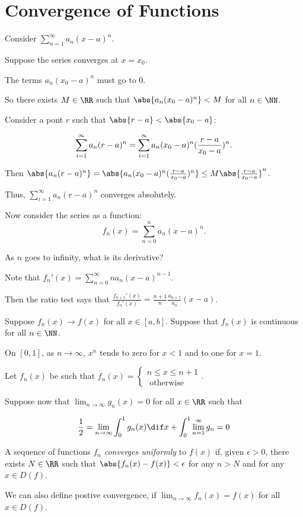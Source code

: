 \documentclass[11pt]{scrartcl}
\begin{document}
\section{Convergence of Functions}


Consider $\sum_{n=1}^{\infty}a_n(x-a)^n$.

Suppose the series converges at $x=x_0$.

The terms $a_n(x_0-a)^n$ must go to 0.

So there exists $M\in\RR$ such that $\abs{a_n(x_0-a)^n}< M$ for all $n\in\NN$.

Consider a pont $r$ such that $\abs{r-a}< \abs{x_0-a}$:

\begin{align}
\sum_{i=1}^{\infty}a_n(r-a)^n = \sum_{i=1}^{\infty}a_n(x_0-a)^n\* (\frac{r-a}{x_0-a})^n.
\end{align}

Then $\abs{a_n(r-a)^n} = \abs{a_n(x_0-a)^n(\frac{r-a}{x_0-a})^n} \leq M \abs{\frac{r-a}{x_0-a}}^n$.

Thus, $\sum_{i=1}^{\infty}a_n(r-a)^n$ converges absolutely.

Now consider the series as a function:
\begin{equation*}
f_{n}(x) = \sum_{n=0}^na_n(x-a)^n.
\end{equation*}

As $n$ goes to infinity, what is its derivative?

Note that $f_n'(x) = \sum_{n=0}^{\infty}na_n(x-a)^{n-1}$.

Then the ratio test says that $\frac{f_{n+1}'(x)}{f_n'(x)} = \frac{n+1}{n}\frac{a_{n+1}}{a_n}(x-a)$.

Suppose $f_n(x) \to f(x)$ for all $x\in [a, b]$. Suppose that $f_n(x)$
is continuous for all $n\in\NN$. 

On $[0, 1]$, as $n\to \infty$, $x^n$ tends to zero for $x<1$ and to one for $x=1$.

\begin{example}

  Let $f_n(x) $ be such that $f_n(x) = \begin{cases}
    n\leq x\leq n+1\\
    \text{ otherwise}
  \end{cases}$.

Suppose now that $\lim_{n\to\infty}g_n(x) = 0$ for all $x\in\RR$ such that

\begin{equation*}
  \frac{1}{2}=\lim_{n\to\infty}\int_0^1 g_n(x) \dif x +\int_{0}^1\lim_{n=1}^{\infty}g_{n} = 0
\end{equation*}
\end{example}
\begin{definition}
  A sequence of functions $f_n$ \textit{converges uniformly} to $f(x)$ if, given $\epsilon > 0$, there exists $N\in\RR$ such that $\abs{f_n(x) - f(x)} < \epsilon$ for any $n > N$ and for any $x\in D(f)$.
\end{definition}
\begin{remark}
We can also define postive convergence, if $\lim_{n\to\infty}f_n(x) = f(x)$ for all $x\in D(f)$.
\end{remark}
\end{document}
